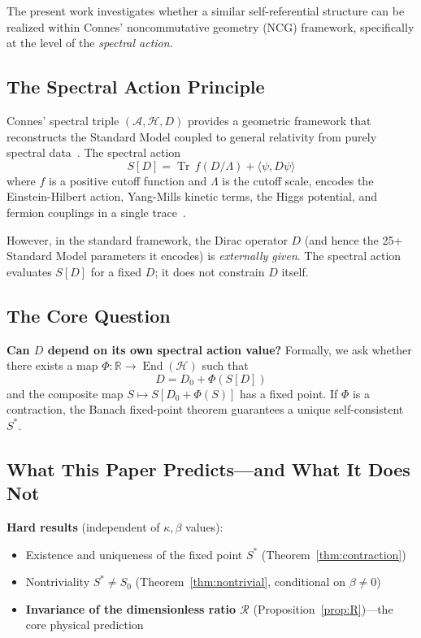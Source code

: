 \documentclass[11pt,a4paper]{article}
\theoremstyle{remark}
\providecommand{\Tr}{\operatorname{Tr}}
\newcommand{\End}{\operatorname{End}}
\newcommand{\R}{\mathcal{R}}
\newcommand{\kappabeta}{\kappa, \beta}
\begin{document}
The present work investigates whether a similar self-referential structure can be realized within Connes' noncommutative geometry (NCG) framework, specifically at the level of the \emph{spectral action}.

\subsection{The Spectral Action Principle}

Connes' spectral triple $(\mathcal{A}, \mathcal{H}, D)$ provides a geometric framework that reconstructs the Standard Model coupled to general relativity from purely spectral data~\cite{Con94, CCM06}. The spectral action
\[
  S[D] = \Tr\, f(D/\Lambda) + \langle\psi, D\psi\rangle
\]
where $f$ is a positive cutoff function and $\Lambda$ is the cutoff scale, encodes the Einstein-Hilbert action, Yang-Mills kinetic terms, the Higgs potential, and fermion couplings in a single trace~\cite{CC96}.

However, in the standard framework, the Dirac operator $D$ (and hence the 25+ Standard Model parameters it encodes) is \emph{externally given}. The spectral action evaluates $S[D]$ for a fixed $D$; it does not constrain $D$ itself.

\subsection{The Core Question}

\textbf{Can $D$ depend on its own spectral action value?} Formally, we ask whether there exists a map $\Phi: \mathbb{R} \to \End(\mathcal{H})$ such that
\[
  D = D_0 + \Phi(S[D])
\]
and the composite map $S \mapsto S[D_0 + \Phi(S)]$ has a fixed point. If $\Phi$ is a contraction, the Banach fixed-point theorem guarantees a unique self-consistent $S^*$.

\subsection{What This Paper Predicts---and What It Does Not}

\textbf{Hard results} (independent of $\kappabeta$ values):
\begin{itemize}
  \item Existence and uniqueness of the fixed point $S^*$ (Theorem~\ref{thm:contraction})
  \item Nontriviality $S^* \neq S_0$ (Theorem~\ref{thm:nontrivial}, conditional on $\beta \neq 0$)
  \item \textbf{Invariance of the dimensionless ratio $\R$} (Proposition~\ref{prop:R})---the core physical prediction
\end{itemize}
\end{document}
